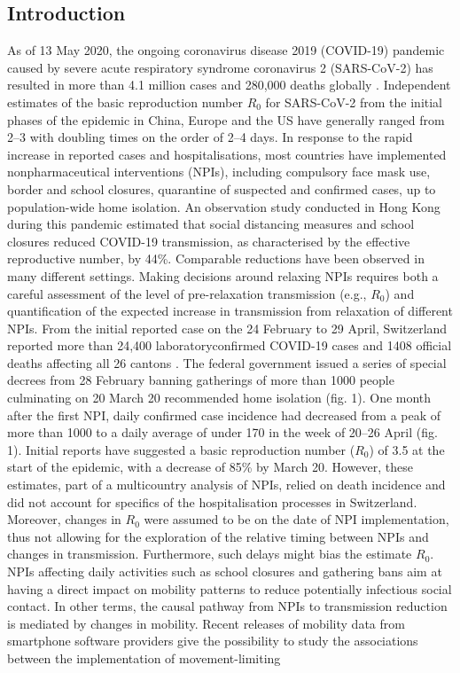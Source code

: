 \subsection{Introduction}
As of 13 May 2020, the ongoing coronavirus disease 2019 (COVID-19) pandemic caused by severe acute respiratory syndrome coronavirus 2 (SARS-CoV-2) has resulted in more than 4.1 million cases and 280,000 deaths globally \cite{WHO:WHOSituationReport:2020}. Independent estimates of the basic reproduction number $R_0$ for SARS-CoV-2 from the initial phases of the epidemic in China, Europe and the US have generally ranged from 2–3 with doubling times on the order of 2–4 days. In response to the rapid increase in reported cases and hospitalisations, most countries have implemented nonpharmaceutical interventions (NPIs), including compulsory face mask use, border and school closures, quarantine of suspected and confirmed cases, up to population-wide home isolation\cite{HITCOVIDTeam:HealthInterventionsTracking:2020}. An observation study conducted in Hong Kong during this pandemic estimated that social distancing measures and school closures reduced COVID-19 transmission, as characterised by the effective reproductive number, by 44\%\cite{Cowling:ImpactAssessmentNonpharmaceutical:2020}. Comparable reductions have been observed in many different settings\cite{Gatto:SpreadDynamicsCOVID19:2020,Flaxman:Report13Estimating:2020}. Making decisions around relaxing NPIs requires both a careful assessment of the level of pre-relaxation transmission (e.g., $R_0$) and quantification of the expected increase in transmission from relaxation of different NPIs. From the initial reported case on the 24 February to 29 April, Switzerland reported more than 24,400 laboratoryconfirmed COVID-19 cases and 1408 official deaths affecting all 26 cantons \cite{OFSP:RapportSituationEpidemiologique:2020}. The federal government issued a series of special decrees from 28 February banning gatherings of more than 1000 people culminating on 20 March 20 recommended home isolation (fig. 1). One month after the first NPI, daily confirmed case incidence had decreased from a peak of more than 1000 to a daily average of under 170 in the week of 20–26 April (fig. 1). Initial reports have suggested a basic reproduction number ($R_0$) of 3.5 at the start of the epidemic, with a decrease of 85\% by March 20\cite{Flaxman:Report13Estimating:2020}. However, these estimates, part of a multicountry analysis of NPIs, relied on death incidence and did not account for specifics of the hospitalisation processes in Switzerland. Moreover, changes in $R_0$ were assumed to be on the date of NPI implementation, thus not allowing for the exploration of the relative timing between NPIs and changes in transmission. Furthermore, such delays might bias the estimate $R_0$. NPIs affecting daily activities such as school closures and gathering bans aim at having a direct impact on mobility patterns to reduce potentially infectious social contact. In other terms, the causal pathway from NPIs to transmission reduction is mediated by changes in mobility. Recent releases of mobility data from smartphone software providers give the possibility to study the associations between the implementation of movement-limiting 